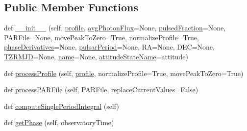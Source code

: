 \subsection*{Public Member Functions}
\begin{DoxyCompactItemize}
\item 
def \hyperlink{classmodest_1_1signals_1_1xraysource_1_1PeriodicXRaySource_aec2233ce744a483cb13753b1b075082b}{\+\_\+\+\_\+init\+\_\+\+\_\+} (self, \hyperlink{classmodest_1_1signals_1_1xraysource_1_1PeriodicXRaySource_a50e061bb97d0dd6ab7f344370c6b35a4}{profile}, \hyperlink{classmodest_1_1signals_1_1xraysource_1_1PeriodicXRaySource_ac227ebef6424695360f2771765b4a4a7}{avg\+Photon\+Flux}=None, \hyperlink{classmodest_1_1signals_1_1xraysource_1_1PeriodicXRaySource_a5f968d9c80e5315d1657eac2ffca4e73}{pulsed\+Fraction}=None, P\+A\+R\+File=None, move\+Peak\+To\+Zero=True, normalize\+Profile=True, \hyperlink{classmodest_1_1signals_1_1xraysource_1_1PeriodicXRaySource_ad885c269b3b042b3d094412683ef3476}{phase\+Derivatives}=None, \hyperlink{classmodest_1_1signals_1_1xraysource_1_1PeriodicXRaySource_aeb6d4a8057d3ee58c81e69fb97b9eef7}{pulsar\+Period}=None, RA=None, D\+EC=None, \hyperlink{classmodest_1_1signals_1_1xraysource_1_1PeriodicXRaySource_aecd53533d34a4f821f4010c197edc2e8}{T\+Z\+R\+M\+JD}=None, \hyperlink{classmodest_1_1signals_1_1xraysource_1_1PeriodicXRaySource_aac8308319d4f31067e1087660a15db03}{name}=None, \hyperlink{classmodest_1_1signals_1_1pointsource_1_1PointSource_a0924a2233bb4fd23e50d024e4f1b048e}{attitude\+State\+Name}=\textquotesingle{}attitude\textquotesingle{})
\item 
def \hyperlink{classmodest_1_1signals_1_1xraysource_1_1PeriodicXRaySource_a50045a93644e23cbaa88a4b4458694e2}{process\+Profile} (self, \hyperlink{classmodest_1_1signals_1_1xraysource_1_1PeriodicXRaySource_a50e061bb97d0dd6ab7f344370c6b35a4}{profile}, normalize\+Profile=True, move\+Peak\+To\+Zero=True)
\item 
def \hyperlink{classmodest_1_1signals_1_1xraysource_1_1PeriodicXRaySource_a98ef4d72f127017fab68dcdeab0dad64}{process\+P\+A\+R\+File} (self, P\+A\+R\+File, replace\+Current\+Values=False)
\item 
def \hyperlink{classmodest_1_1signals_1_1xraysource_1_1PeriodicXRaySource_a20315b15ec1f6141e35a029b5cabf717}{compute\+Single\+Period\+Integral} (self)
\item 
def \hyperlink{classmodest_1_1signals_1_1xraysource_1_1PeriodicXRaySource_a3ea2f37c1387cc682819e667a8ce7f1e}{get\+Phase} (self, observatory\+Time)
\item 

\end{DoxyCompactItemize}
